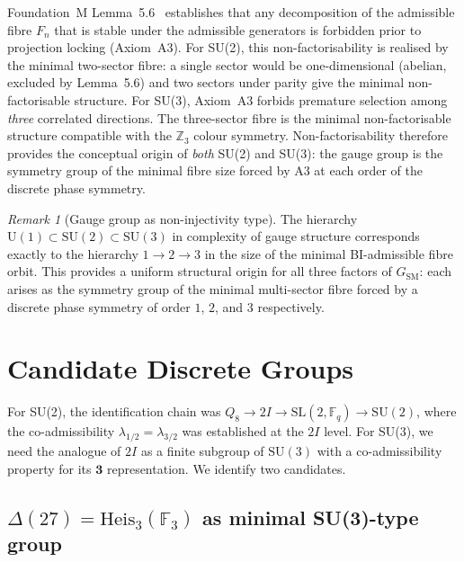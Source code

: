 \documentclass[11pt,a4paper]{article}
\theoremstyle{definition}
\theoremstyle{remark}
\newtheorem{remark}[theorem]{Remark}
\newcommand{\Heis}{\mathrm{Heis}}
\newcommand{\SU}{\mathrm{SU}}
\newcommand{\Fq}{\mathbb{F}_q}
\newcommand{\Z}{\mathbb{Z}}
\begin{document}
      Foundation~M Lemma~5.6~\cite{Beau2026m} establishes that any decomposition of the admissible
      fibre $F_n$ that is stable under the admissible generators is forbidden prior to projection
      locking (Axiom~A3).
      For SU(2), this non-factorisability is realised by the minimal two-sector fibre: a single
      sector would be one-dimensional (abelian, excluded by Lemma~5.6) and two sectors under parity
      give the minimal non-factorisable structure.
      For SU(3), Axiom~A3 forbids premature selection among \emph{three} correlated directions.
      The three-sector fibre is the minimal non-factorisable structure compatible with the $\Z_3$
      colour symmetry.
      Non-factorisability therefore provides the conceptual origin of \emph{both} SU(2) and SU(3):
      the gauge group is the symmetry group of the minimal fibre size forced by A3 at each order
      of the discrete phase symmetry.

      \begin{remark}[Gauge group as non-injectivity type]
        \label{rmk:gauge-from-noninjective}
        The hierarchy $\mathrm{U}(1) \subset \SU(2) \subset \SU(3)$ in complexity of gauge structure
        corresponds exactly to the hierarchy $1 \to 2 \to 3$ in the size of the minimal BI-admissible
        fibre orbit.
        This provides a uniform structural origin for all three factors of $G_{\mathrm{SM}}$: each
        arises as the symmetry group of the minimal multi-sector fibre forced by a discrete phase
        symmetry of order $1$, $2$, and $3$ respectively.
      \end{remark}

  \section{Candidate Discrete Groups}
    \label{sec:discrete-groups}

    For SU(2), the identification chain was $Q_8 \to 2I \to \mathrm{SL}(2,\Fq) \to \SU(2)$,
    where the co-admissibility $\lambda_{1/2} = \lambda_{3/2}$ was established at the $2I$ level.
    For SU(3), we need the analogue of $2I$ as a finite subgroup of $\SU(3)$ with a co-admissibility
    property for its $\mathbf{3}$ representation.
    We identify two candidates.

    \subsection{\texorpdfstring{$\Delta(27) = \Heis_3(\mathbb{F}_3)$}{Delta(27)} as minimal SU(3)-type group}
      \label{ssec:delta27}
\end{document}
